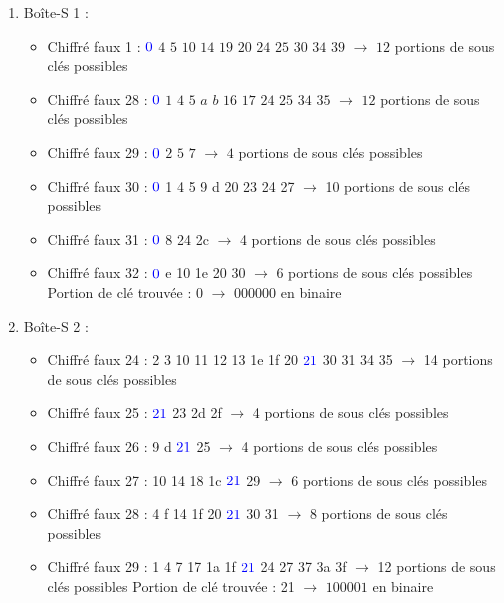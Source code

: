 \documentclass[11pt]{article}
\begin{document}
\begin{enumerate}
	\item Boîte-S 1 : 
	\begin{itemize}
		\item Chiffré faux 1 : $\color{blue}0$ $4$ $5$ $10$ $14$ $19$ $20$ $24$ $25$ $30$ $34$ $39$ $\longrightarrow$ $12$ portions de sous clés possibles
		\item Chiffré faux 28 : $\color{blue}0$ $1$ $4$ $5$ $a$ $b$ $16$ $17$ $24$ $25$ $34$ $35$ $\longrightarrow$ $12$ portions de sous clés possibles
		\item Chiffré faux 29 : $\color{blue}0$ $2$ $5$ $7$ $\longrightarrow$ $4$ portions de sous clés possibles
		\item Chiffré faux 30 : $\color{blue}0$ 1 4 5 9 d 20 23 24 27 $\longrightarrow$ 10 portions de sous clés possibles
		\item Chiffré faux 31 : $\color{blue}0$ 8 24 2c $\longrightarrow$ 4 portions de sous clés possibles
		\item Chiffré faux 32 : $\color{blue}0$ e 10 1e 20 30 $\longrightarrow$ 6 portions de sous clés possibles \newline
		Portion de clé trouvée : 0 $\longrightarrow$ $000000$ en binaire
	\end{itemize}

	\item Boîte-S 2 : 
\begin{itemize}
	\item Chiffré faux 24 : 2 3 10 11 12 13 1e 1f 20 $\color{blue}21$ 30 31 34 35 $\longrightarrow$ 14 portions de sous clés possibles
	\item Chiffré faux 25 : $\color{blue}21$ 23 2d 2f $\longrightarrow$ 4 portions de sous clés possibles
	\item Chiffré faux 26 : 9 d $\color{blue}21$ 25 $\longrightarrow$ 4 portions de sous clés possibles
	\item Chiffré faux 27 : 10 14 18 1c $\color{blue}21$ 29 $\longrightarrow$ 6 portions de sous clés possibles
	\item Chiffré faux 28 : 4 f 14 1f 20 $\color{blue}21$ 30 31 $\longrightarrow$ 8 portions de sous clés possibles
	\item Chiffré faux 29 : 1 4 7 17 1a 1f $\color{blue}21$ 24 27 37 3a 3f $\longrightarrow$ 12 portions de sous clés possibles \newline
	Portion de clé trouvée : 21 $\longrightarrow$ $100001$ en binaire
\end{itemize}


\end{enumerate}
\end{document}
